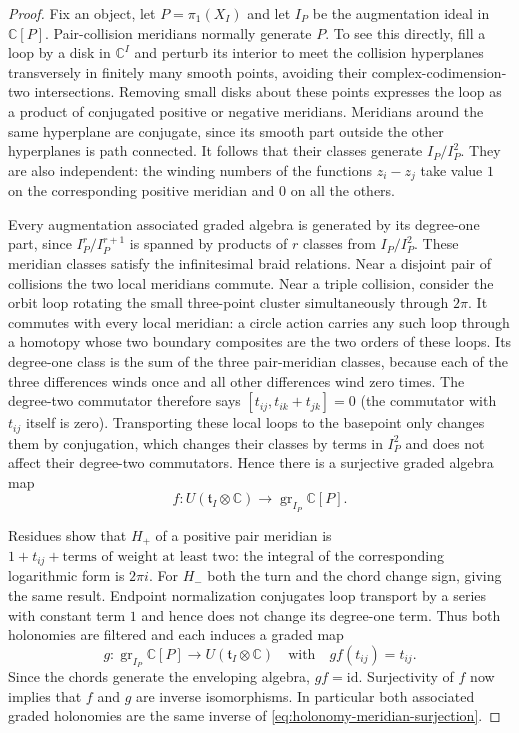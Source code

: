 \documentclass[11pt]{article}
\theoremstyle{definition}
\theoremstyle{remark}
\numberwithin{equation}{section}
\begin{document}
\begin{proof}
Fix an object, let $P=\pi_1(X_I)$ and let $I_P$ be the augmentation
ideal in $\mathbb C[P]$.  Pair-collision meridians normally generate $P$.
To see this directly, fill a loop by a disk in $\mathbb C^I$ and perturb its
interior to meet the collision hyperplanes transversely in finitely
many smooth points, avoiding their complex-codimension-two
intersections.  Removing small disks about these points expresses the
loop as a product of conjugated positive or negative meridians.
Meridians around the same hyperplane are conjugate, since its smooth
part outside the other hyperplanes is path connected.  It follows
that their classes generate $I_P/I_P^2$.  They are also independent:
the winding numbers of the functions $z_i-z_j$ take value $1$ on the
corresponding positive meridian and $0$ on all the others.

Every augmentation associated graded algebra is generated by its
degree-one part, since $I_P^r/I_P^{r+1}$ is spanned by products of $r$
classes from $I_P/I_P^2$.  These meridian classes satisfy the
infinitesimal braid relations.  Near a disjoint pair of collisions
the two local meridians commute.  Near a triple collision, consider
the orbit loop rotating the small three-point cluster simultaneously
through $2\pi$.  It commutes with every local meridian: a circle
action carries any such loop through a homotopy whose two boundary
composites are the two orders of these loops.  Its degree-one class
is the sum of the three pair-meridian classes, because each of the
three differences winds once and all other differences wind zero
times.  The degree-two commutator therefore says
$[t_{ij},t_{ik}+t_{jk}]=0$ (the commutator with $t_{ij}$ itself is
zero).  Transporting these local loops to the basepoint only changes
them by conjugation, which changes their classes by terms in $I_P^2$
and does not affect their degree-two commutators.  Hence there is a
surjective graded algebra map
\begin{equation}\label{eq:holonomy-meridian-surjection}
 f:U(\mathfrak t_I\otimes\mathbb C)
 \longrightarrow\operatorname{gr}_{I_P}\mathbb C[P].
\end{equation}

Residues show that $H_+$ of a positive pair meridian is
$1+t_{ij}+\text{terms of weight at least two}$: the integral of the
corresponding logarithmic form is $2\pi i$.  For $H_-$ both the turn
and the chord change sign, giving the same result.  Endpoint
normalization conjugates loop transport by a series with constant
term $1$ and hence does not change its degree-one term.  Thus both
holonomies are filtered and each induces a graded map
\[
 g:\operatorname{gr}_{I_P}\mathbb C[P]
 \longrightarrow U(\mathfrak t_I\otimes\mathbb C)
 \quad\text{with}\quad g f(t_{ij})=t_{ij}.
\]
Since the chords generate the enveloping algebra, $gf=\mathrm{id}$.
Surjectivity of $f$ now implies that $f$ and $g$ are inverse
isomorphisms.  In particular both associated graded holonomies are
the same inverse of \eqref{eq:holonomy-meridian-surjection}.


\end{proof}
\end{document}
